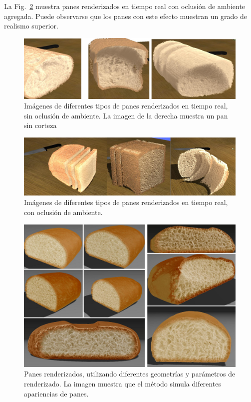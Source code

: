 La Fig.~\ref{fg:breads} muestra panes renderizados en tiempo real con oclusión de ambiente agregada.
Puede observarse que los panes con este efecto muestran un grado de realismo superior.

\begin{figure}[htb!]
  \centerline{\includegraphics[width=12cm]{figures/fig5}}
  \caption[Imágenes de diferentes tipos de panes renderizados en tiempo real, sin oclusión de ambiente]{Imágenes de diferentes tipos de panes renderizados en tiempo real, sin oclusión de ambiente. La imagen de la derecha muestra un pan sin corteza}
  \label{fg:breadsnooc}
\end{figure}


\begin{figure}[htb!]
  \centerline{\includegraphics[width=12cm]{figures/breads}}
  \caption{Imágenes de diferentes tipos de panes renderizados en tiempo real, con oclusión de ambiente.}
  \label{fg:breads}
\end{figure}


\begin{figure}
  \centerline{\includegraphics[width=12cm]{figures/Fig12CAVW}}
  \caption[Panes renderizados, utilizando diferentes geometrías y parámetros de renderizado]{Panes renderizados, utilizando diferentes geometrías y parámetros de renderizado. La imagen muestra que el método simula diferentes apariencias de panes.}
  \label{fg:Fig12}
\end{figure}


